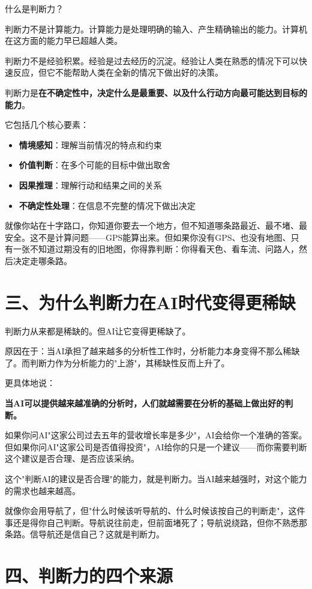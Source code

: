 什么是判断力？

判断力不是计算能力。计算能力是处理明确的输入、产生精确输出的能力。计算机在这方面的能力早已超越人类。

判断力不是经验积累。经验是过去经历的沉淀。经验让人类在熟悉的情况下可以快速反应，但它不能帮助人类在全新的情况下做出好的决策。

判断力是\textbf{在不确定性中，决定什么是最重要、以及什么行动方向最可能达到目标的能力}。

它包括几个核心要素：

\begin{itemize}
\item \textbf{情境感知}：理解当前情况的特点和约束
\item \textbf{价值判断}：在多个可能的目标中做出取舍
\item \textbf{因果推理}：理解行动和结果之间的关系
\item \textbf{不确定性处理}：在信息不完整的情况下做出决定

\end{itemize}
就像你站在十字路口，你知道你要去一个地方，但不知道哪条路最近、最不堵、最安全。这不是计算问题——GPS能算出来。但如果你没有GPS、也没有地图、只有一张不知道过期没有的旧地图，你得靠判断：你得看天色、看车流、问路人，然后决定走哪条路。

\section{三、为什么判断力在AI时代变得更稀缺}


判断力从来都是稀缺的。但AI让它变得更稀缺了。

原因在于：当AI承担了越来越多的分析性工作时，分析能力本身变得不那么稀缺了。而判断力作为分析能力的"上游"，其稀缺性反而上升了。

更具体地说：

\textbf{当AI可以提供越来越准确的分析时，人们就越需要在分析的基础上做出好的判断。}

如果你问AI"这家公司过去五年的营收增长率是多少"，AI会给你一个准确的答案。但如果你问AI"这家公司是否值得投资"，AI给你的只是一个建议——而你需要判断这个建议是否合理、是否应该采纳。

这个"判断AI的建议是否合理"的能力，就是判断力。当AI越来越强时，对这个能力的需求也越来越高。

就像你会用导航了，但"什么时候该听导航的、什么时候该按自己的判断走"，这件事还是得你自己判断。导航说往前走，但前面堵死了；导航说绕路，但你不熟悉那条路。信导航还是信自己？这就是判断力。

\section{四、判断力的四个来源}


